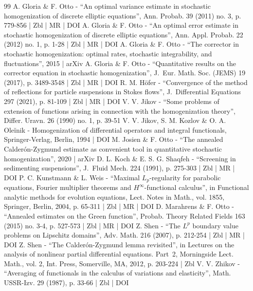 \begin{thebibliography}{99}
A. Gloria \& F. Otto - “An optimal variance estimate in stochastic homogenization of discrete elliptic equations”, Ann. Probab. 39 (2011) no. 3, p. 779-856 | Zbl | MR | DOI
A. Gloria \& F. Otto - “An optimal error estimate in stochastic homogenization of discrete elliptic equations”, Ann. Appl. Probab. 22 (2012) no. 1, p. 1-28 | Zbl | MR | DOI
A. Gloria \& F. Otto - “The corrector in stochastic homogenization: optimal rates, stochastic integrability, and fluctuations”, 2015 | arXiv
A. Gloria \& F. Otto - “Quantitative results on the corrector equation in stochastic homogenization”, J. Eur. Math. Soc. (JEMS) 19 (2017), p. 3489-3548 | Zbl | MR | DOI
R. M. Höfer - “Convergence of the method of reflections for particle suspensions in Stokes flows”, J. Differential Equations 297 (2021), p. 81-109 | Zbl | MR | DOI
V. V. Jikov - “Some problems of extension of functions arising in connection with the homogenization theory”, Differ. Uravn. 26 (1990) no. 1, p. 39-51
V. V. Jikov, S. M. Kozlov \& O. A. Oleĭnik - Homogenization of differential operators and integral functionals, Springer-Verlag, Berlin, 1994 | DOI
M. Josien \& F. Otto - “The annealed Calderón-Zygmund estimate as convenient tool in quantitative stochastic homogenization”, 2020 | arXiv
D. L. Koch \& E. S. G. Shaqfeh - “Screening in sedimenting suspensions”, J. Fluid Mech. 224 (1991), p. 275-303 | Zbl | MR | DOI
P. C. Kunstmann \& L. Weis - “Maximal $L_p$-regularity for parabolic equations, Fourier multiplier theorems and $H^\infty $-functional calculus”, in Functional analytic methods for evolution equations, Lect. Notes in Math., vol. 1855, Springer, Berlin, 2004, p. 65-311 | Zbl | MR | DOI
D. Marahrens \& F. Otto - “Annealed estimates on the Green function”, Probab. Theory Related Fields 163 (2015) no. 3-4, p. 527-573 | Zbl | MR | DOI
Z. Shen - “The $L^p$ boundary value problems on Lipschitz domains”, Adv. Math. 216 (2007), p. 212-254 | Zbl | MR | DOI
Z. Shen - “The Calderón-Zygmund lemma revisited”, in Lectures on the analysis of nonlinear partial differential equations. Part 2, Morningside Lect. Math., vol. 2, Int. Press, Somerville, MA, 2012, p. 203-224 | Zbl
V. V. Zhikov - “Averaging of functionals in the calculus of variations and elasticity”, Math. USSR-Izv. 29 (1987), p. 33-66 | Zbl | DOI
\end{thebibliography}
